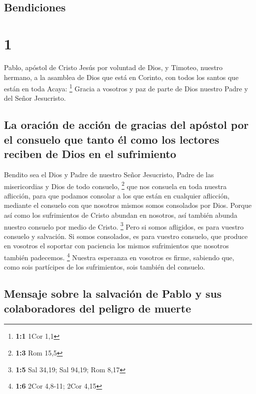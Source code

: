 \hypertarget{bendiciones}{%
\subsection{Bendiciones}\label{bendiciones}}

\hypertarget{section}{%
\section{1}\label{section}}

 Pablo, apóstol de Cristo Jesús por voluntad de Dios, y
Timoteo, nuestro hermano, a la asamblea de Dios que está en Corinto, con
todos los santos que están en toda Acaya: \footnote{\textbf{1:1} 1Cor
  1,1}  Gracia a vosotros y paz de parte de Dios nuestro
Padre y del Señor Jesucristo.

\hypertarget{la-oraciuxf3n-de-acciuxf3n-de-gracias-del-apuxf3stol-por-el-consuelo-que-tanto-uxe9l-como-los-lectores-reciben-de-dios-en-el-sufrimiento}{%
\subsection{La oración de acción de gracias del apóstol por el consuelo
que tanto él como los lectores reciben de Dios en el
sufrimiento}\label{la-oraciuxf3n-de-acciuxf3n-de-gracias-del-apuxf3stol-por-el-consuelo-que-tanto-uxe9l-como-los-lectores-reciben-de-dios-en-el-sufrimiento}}

 Bendito sea el Dios y Padre de nuestro Señor Jesucristo,
Padre de las misericordias y Dios de todo consuelo, \footnote{\textbf{1:3}
  Rom 15,5}  que nos consuela en toda nuestra aflicción,
para que podamos consolar a los que están en cualquier aflicción,
mediante el consuelo con que nosotros mismos somos consolados por Dios.
 Porque así como los sufrimientos de Cristo abundan en
nosotros, así también abunda nuestro consuelo por medio de Cristo.
\footnote{\textbf{1:5} Sal 34,19; Sal 94,19; Rom 8,17} 
Pero si somos afligidos, es para vuestro consuelo y salvación. Si somos
consolados, es para vuestro consuelo, que produce en vosotros el
soportar con paciencia los mismos sufrimientos que nosotros también
padecemos. \footnote{\textbf{1:6} 2Cor 4,8-11; 2Cor 4,15} 
Nuestra esperanza en vosotros es firme, sabiendo que, como sois
partícipes de los sufrimientos, sois también del consuelo.

\hypertarget{mensaje-sobre-la-salvaciuxf3n-de-pablo-y-sus-colaboradores-del-peligro-de-muerte}{%
\subsection{Mensaje sobre la salvación de Pablo y sus colaboradores del
peligro de
muerte}\label{mensaje-sobre-la-salvaciuxf3n-de-pablo-y-sus-colaboradores-del-peligro-de-muerte}}

